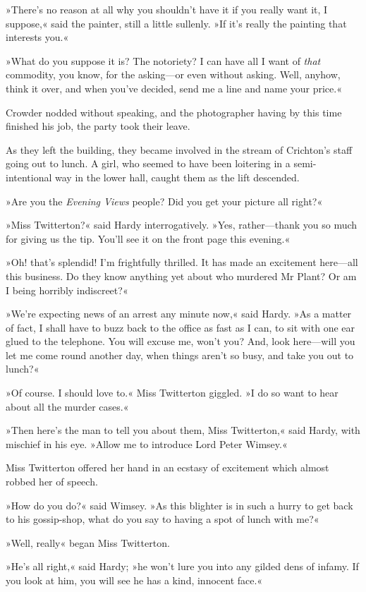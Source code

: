 »There's no reason at all why you shouldn't have it if you really want it, I suppose,« said the painter, still a little sullenly. »If it's really the painting that interests you.«

»What do you suppose it is? The notoriety? I can have all I want of \textit{that} commodity, you know, for the asking—or even without asking. Well, anyhow, think it over, and when you've decided, send me a line and name your price.«

Crowder nodded without speaking, and the photographer having by this time finished his job, the party took their leave.

As they left the building, they became involved in the stream of Crichton's staff going out to lunch. A girl, who seemed to have been loitering in a semi-intentional way in the lower hall, caught them as the lift descended.

»Are you the \textit{Evening Views} people? Did you get your picture all right?«

»Miss Twitterton?« said Hardy interrogatively. »Yes, rather—thank you so much for giving us the tip. You'll see it on the front page this evening.«

»Oh! that's splendid! I'm frightfully thrilled. It has made an excitement here—all this business. Do they know anything yet about who murdered Mr Plant? Or am I being horribly indiscreet?«

»We're expecting news of an arrest any minute now,« said Hardy. »As a matter of fact, I shall have to buzz back to the office as fast as I can, to sit with one ear glued to the telephone. You will excuse me, won't you? And, look here—will you let me come round another day, when things aren't so busy, and take you out to lunch?«

»Of course. I should love to.« Miss Twitterton giggled. »I do so want to hear about all the murder cases.«

»Then here's the man to tell you about them, Miss Twitterton,« said Hardy, with mischief in his eye. »Allow me to introduce Lord Peter Wimsey.«

Miss Twitterton offered her hand in an ecstasy of excitement which almost robbed her of speech.

»How do you do?« said Wimsey. »As this blighter is in such a hurry to get back to his gossip-shop, what do you say to having a spot of lunch with me?«

»Well, really\longdash« began Miss Twitterton.

»He's all right,« said Hardy; »he won't lure you into any gilded dens of infamy. If you look at him, you will see he has a kind, innocent face.«

